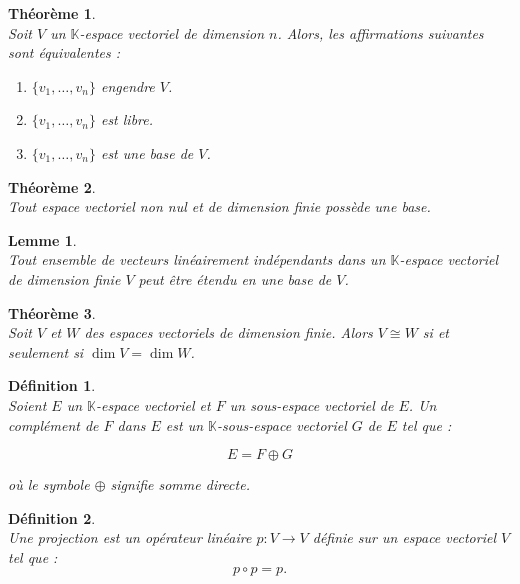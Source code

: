 \documentclass[a4paper, 14pt]{report}
\newtheorem{definition}{Définition}[section]
\newtheorem{theorem}{Théorème}[section]
\newtheorem{lemma}{Lemme}
\begin{document}
\begin{onehalfspace}
{\begin{theorem} \cite{lang2012algebra} \\
Soit \( V \) un \(\mathbb{K}\)-espace vectoriel de dimension \( n \). Alors, les affirmations suivantes sont équivalentes :
	\begin{enumerate}[label=(\alph*)]
		\item \( \{v_1, \ldots, v_n\} \) engendre \( V \).
		\item \( \{v_1, \ldots, v_n\} \) est libre.
		\item \( \{v_1, \ldots, v_n\} \) est une base de \( V \).
	\end{enumerate}
\end{theorem}


\begin{theorem} \cite{lang2012algebra} \\
Tout espace vectoriel non nul et de dimension finie possède une base.
\end{theorem}

\begin{lemma} \cite{lang2012algebra} \\
Tout ensemble de vecteurs linéairement indépendants dans un \(\mathbb{K}\)-espace vectoriel de dimension finie \( V \) peut être étendu en une base de \( V \).
\end{lemma}

\begin{theorem} \cite{lang2012algebra} \\
Soit \( V \) et \( W \) des espaces vectoriels de dimension finie. Alors \( V \cong W \) si et seulement si \( \dim V = \dim W \).
\end{theorem}

\begin{definition} \cite{lang2012algebra} \\
Soient \( E \) un \(\mathbb{K}\)-espace vectoriel et \( F \) un sous-espace vectoriel de \( E \).  
Un complément de \( F \) dans \( E \) est un \(\mathbb{K}\)-sous-espace vectoriel \( G \) de \( E \) tel que :

\[
E = F \oplus G
\]

où le symbole \( \oplus \) signifie somme directe.
\end{definition}

\begin{definition} \cite{lang2012algebra}\\
Une projection est un opérateur linéaire \( p : V \to V \) définie sur un espace vectoriel \( V \) tel que :
\[
p \circ p = p.
\]
\end{definition}


}
\end{onehalfspace}
\end{document}
